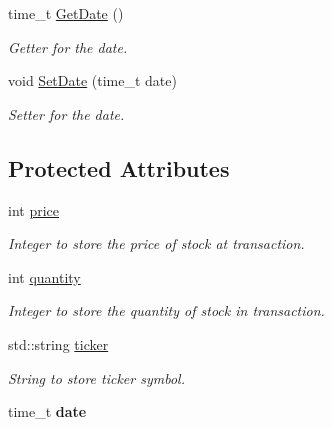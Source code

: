 \begin{DoxyCompactItemize}
\mbox{\label{class_transaction_type_a5e4e3170dda80d69f67efd3044bb30e0}} 
time\+\_\+t \mbox{\hyperlink{class_transaction_type_a5e4e3170dda80d69f67efd3044bb30e0}{Get\+Date}} ()
\begin{DoxyCompactList}\small\item\em Getter for the date. \end{DoxyCompactList}\item 
\mbox{\label{class_transaction_type_aefd70a5b3d72944d0ddd7aa289c0021a}} 
void \mbox{\hyperlink{class_transaction_type_aefd70a5b3d72944d0ddd7aa289c0021a}{Set\+Date}} (time\+\_\+t date)
\begin{DoxyCompactList}\small\item\em Setter for the date. \end{DoxyCompactList}\end{DoxyCompactItemize}
\subsection*{Protected Attributes}
\begin{DoxyCompactItemize}
\item 
\mbox{\label{class_transaction_type_a079b40eebde548904529841f8746d4ff}} 
int \mbox{\hyperlink{class_transaction_type_a079b40eebde548904529841f8746d4ff}{price}}
\begin{DoxyCompactList}\small\item\em Integer to store the price of stock at transaction. \end{DoxyCompactList}\item 
\mbox{\label{class_transaction_type_a60b6221cf4b0bf30f5c4a4e15893b98d}} 
int \mbox{\hyperlink{class_transaction_type_a60b6221cf4b0bf30f5c4a4e15893b98d}{quantity}}
\begin{DoxyCompactList}\small\item\em Integer to store the quantity of stock in transaction. \end{DoxyCompactList}\item 
\mbox{\label{class_transaction_type_aad758d557417a18c944dc9849a390391}} 
std\+::string \mbox{\hyperlink{class_transaction_type_aad758d557417a18c944dc9849a390391}{ticker}}
\begin{DoxyCompactList}\small\item\em String to store ticker symbol. \end{DoxyCompactList}\item 
\mbox{\label{class_transaction_type_afb98c9a6a95e2fd8157448edb9eeecce}} 
time\+\_\+t {\bfseries date}
\end{DoxyCompactItemize}


